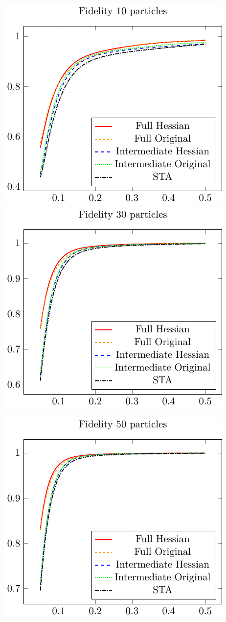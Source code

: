 \documentclass{article}
\begin{document}
\includegraphics{./gfx/fidelity_np10_nlambda5.pdf}
\includegraphics{./gfx/fidelity_np30_nlambda5.pdf}

\begin{center}
	\includegraphics{./gfx/fidelity_np50_nlambda5.pdf}
\end{center}
\end{document}
